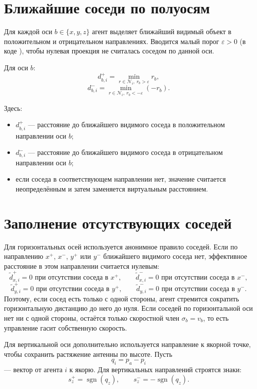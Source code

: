 \documentclass[a4paper,11pt]{article}
\newcommand{\code}[1]{\texttt{\detokenize{#1}}}
\newcommand{\sgn}{\operatorname{sgn}}
\begin{document}
\section{Ближайшие соседи по полуосям}

Для каждой оси $b\in\{x,y,z\}$ агент выделяет ближайший видимый объект в
положительном и отрицательном направлениях. Вводится малый порог
$\varepsilon>0$ (в коде \code{AXIS\_EPS\_M}), чтобы нулевая проекция не
считалась соседом по данной оси.

Для оси $b$:
\[
  d_{b,i}^{+} =
  \min_{r\in\mathcal{N}_i,\ r_b>\varepsilon} r_b,
\]
\[
  d_{b,i}^{-} =
  \min_{r\in\mathcal{N}_i,\ r_b<-\varepsilon} (-r_b).
\]

Здесь:
\begin{itemize}
  \item $d_{b,i}^{+}$ --- расстояние до ближайшего видимого соседа в
  положительном направлении оси $b$;
  \item $d_{b,i}^{-}$ --- расстояние до ближайшего видимого соседа в
  отрицательном направлении оси $b$;
  \item если соседа в соответствующем направлении нет, значение считается
  неопределённым и затем заменяется виртуальным расстоянием.
\end{itemize}

\section{Заполнение отсутствующих соседей}

Для горизонтальных осей используется анонимное правило соседей. Если по
направлению $x^+$, $x^-$, $y^+$ или $y^-$ ближайшего видимого соседа нет,
эффективное расстояние в этом направлении считается нулевым:
\[
  \tilde d_{x,i}^{+}=0 \text{ при отсутствии соседа в } x^+,\qquad
  \tilde d_{x,i}^{-}=0 \text{ при отсутствии соседа в } x^-,
\]
\[
  \tilde d_{y,i}^{+}=0 \text{ при отсутствии соседа в } y^+,\qquad
  \tilde d_{y,i}^{-}=0 \text{ при отсутствии соседа в } y^-.
\]
Поэтому, если сосед есть только с одной стороны, агент стремится сократить
горизонтальную дистанцию до него до нуля. Если соседей по горизонтальной оси
нет ни с одной стороны, остаётся только скоростной член $\sigma_b=v_b$, то есть
управление гасит собственную скорость.

Для вертикальной оси дополнительно используется направление к якорной точке,
чтобы сохранить растяжение антенны по высоте. Пусть
\[
  q_i = p_a-p_i
\]
--- вектор от агента $i$ к якорю. Для вертикальных направлений строятся знаки:
\[
  s_z^+=\sgn(q_z),\qquad s_z^-=-\sgn(q_z).
\]
\end{document}
